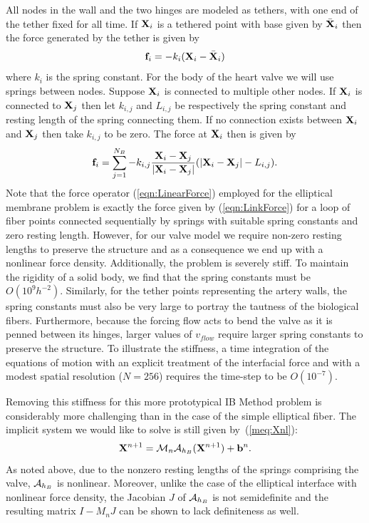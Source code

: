 All nodes in the wall and the two hinges are modeled as tethers, with one end of the tether fixed for all time. If $\mathbf{X}_i$ is a tethered point with base given by $\bar{\mathbf{X}}_i$ then the force generated by the tether is given by 
\begin{equation}
\mathbf{f}_i = -k_i (\mathbf{X}_i-\bar{\mathbf{X}}_i)
\label{eqn:TetherForce}
\end{equation}
where $k_i$ is the spring constant. For the body of the heart valve we will use springs between nodes. Suppose $\mathbf{X}_i$ is connected to multiple other nodes. If $\mathbf{X}_i$ is connected to $\mathbf{X}_j$ then let $k_{i,j}$ and $L_{i,j}$ be respectively the spring constant and resting length of the spring connecting them. If no connection exists between $\mathbf{X}_i$ and $\mathbf{X}_j$ then take $k_{i,j}$ to be zero. The force at $\mathbf{X}_i$ then is given by
\begin{equation}
\mathbf{f}_i = \sum_{j=1}^{N_B} -k_{i,j} \frac{\mathbf{X}_i-\mathbf{X}_j}{|\mathbf{X}_i-\mathbf{X}_j|}
(|\mathbf{X}_i-\mathbf{X}_j| - L_{i,j}).
\label{eqn:LinkForce}
\end{equation}
Note that the force operator (\ref{eqn:LinearForce}) employed for the elliptical membrane problem 
is exactly the force given by (\ref{eqn:LinkForce}) for a loop of fiber points connected sequentially by springs with suitable spring constants and zero resting length. 
However, for our valve model we require non-zero resting lengths to preserve the structure and as a consequence we end up with a nonlinear force density.
Additionally, the problem is severely stiff. To maintain the rigidity of a solid body,  we find that the
 spring constants must be $O(10^9h^{-2})$. Similarly, for the tether points representing the artery walls, the spring constants must also be very large to portray the tautness of the biological fibers. Furthermore, because the forcing flow acts to bend the valve as it is penned between its hinges,  larger values of $v_{flow}$ require larger spring constants to preserve the structure. 
To illustrate the stiffness, a time integration of the equations of motion with an explicit treatment 
of the interfacial force and with a modest spatial resolution ($N=256$) requires the time-step to be 
$O(10^{-7})$.  

 Removing this stiffness for this more prototypical IB Method problem is considerably  more challenging than in the case of the simple elliptical fiber. The implicit system we would like to solve is still given 
 by~(\ref{meq:Xnl}):
$$
\mathbf{X}^{n+1} = \mathcal{M}_n\mathcal{A}_{h_B} (\mathbf{X}^{n+1}) + \mathbf{b}^n.
$$
As noted above, due to the nonzero resting lengths of the springs comprising the valve, 
$\mathcal{A}_{h_B}$ is nonlinear. Moreover, unlike the case of the elliptical interface with
nonlinear force density,  the Jacobian $J$ of $\mathcal{A}_{h_B}$ is not semidefinite and the resulting matrix $I - M_nJ$ can be shown to lack definiteness as well.

